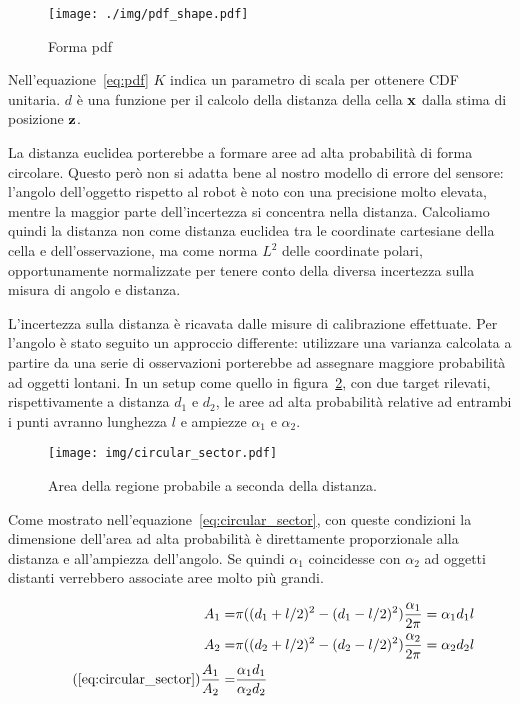 \documentclass[10pt]{beamer}
\begin{document}
	\begin{figure}[H]
		\centering
		\texttt{[image: ./img/pdf\_shape.pdf]}
		\caption{Forma pdf}
		\label{fig:pdf_shape}
	\end{figure}

	Nell'equazione~\ref{eq:pdf} $K$ indica un parametro di scala per ottenere
	CDF unitaria. $d$ è una funzione per il calcolo della distanza della cella
	$ {\bf x} $ dalla stima di posizione $ {\bf z} $.

	La distanza euclidea porterebbe a formare aree ad alta probabilità di forma
	circolare. Questo però non si adatta bene al nostro modello di errore del
	sensore: l'angolo dell'oggetto rispetto al robot è noto con una precisione
	molto elevata, mentre la maggior parte dell'incertezza si concentra nella
	distanza. Calcoliamo quindi la distanza non come distanza euclidea tra le
	coordinate cartesiane della cella e dell'osservazione, ma come norma $ L^2
	$ delle coordinate polari, opportunamente normalizzate per tenere conto
	della diversa incertezza sulla misura di angolo e distanza.

	L'incertezza sulla distanza è ricavata dalle misure di calibrazione
	effettuate. Per l'angolo è stato seguito un approccio differente:
	utilizzare una varianza calcolata a partire da una serie di osservazioni
	porterebbe ad assegnare maggiore probabilità ad oggetti lontani.  In un
	setup come quello in figura~\ref{fig:circular_sector}, con due target
	rilevati, rispettivamente a distanza $d_1$ e $d_2$, le aree ad alta
	probabilità relative ad entrambi i punti avranno lunghezza $l$ e ampiezze $
	\alpha_1 \text{ e } \alpha_2  $. 
	
	\begin{figure}[H]
		\centering
		\texttt{[image: img/circular\_sector.pdf]}
		\caption{Area della regione probabile a seconda della distanza.}
		\label{fig:circular_sector}
	\end{figure}

	Come mostrato nell'equazione~\ref{eq:circular_sector}, con queste
	condizioni la dimensione dell'area ad alta probabilità è direttamente
	proporzionale alla distanza e all'ampiezza dell'angolo. Se quindi $
	\alpha_1 $ coincidesse con $ \alpha _2 $ ad oggetti distanti verrebbero
	associate aree molto più grandi. 

	\begin{subequations}\label{eq:circular_sector}
	\begin{align*} 
		A_1  = & \pi((d_1+l/2)^2-(d_1-l/2)^2)\frac{\alpha_1}{2\pi}  =  \alpha_1 d_1l \\
		A_2  = & \pi((d_2+l/2)^2-(d_2-l/2)^2)\frac{\alpha_2}{2\pi}  =  \alpha_2 d_2l \\
\tag{\ref{eq:circular_sector}}
		\frac{A_1}{A_2} = & \frac	{\alpha_1 d_1} {\alpha_2 d_2}
	\end{align*}
	\end{subequations}
	
\end{document}
